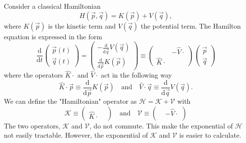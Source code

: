 Consider a classical Hamiltonian
\begin{equation}
H(\vec{p}, \vec{q}) = K(\vec{p}) + V(\vec{q}),
\end{equation}
where $K(\vec{p})$ is the kinetic term and $V(\vec{q})$ the potential term. The Hamilton equation is expressed in the form
\begin{equation}
\frac{\mathrm{d}}{\mathrm{d} t} 
\left( \begin{matrix}
\vec{p}(t) \\
\vec{q}(t)
\end{matrix} \right)
= 
\left( \begin{matrix}
- \frac{\mathrm{d}}{\mathrm{d} \vec{q}} V(\vec{q}) \\
\frac{\mathrm{d}}{\mathrm{d} \vec{p}} K(\vec{p})
\end{matrix} \right)
\equiv
\left( \begin{matrix}
 & - \hat{V} \cdot \\
\hat{K} \cdot &
\end{matrix} \right)
\left( \begin{matrix}
\vec{p} \\
\vec{q}
\end{matrix} \right)
\end{equation}
where the operators $\hat{K} \cdot$ and $\hat{V} \cdot$ act in the following way
\begin{equation}
\hat{K} \cdot \vec{p} \equiv \frac{\mathrm{d}}{\mathrm{d} \vec{p}} K(\vec{p}) \quad \mathrm{and} \quad \hat{V} \cdot \vec{q} \equiv \frac{\mathrm{d}}{\mathrm{d} \vec{q}} V(\vec{q}).
\end{equation}
We can define the "Hamiltonian" operator as $\mathcal{H} = \mathcal{K} + \mathcal{V}$ with
\begin{equation}
\mathcal{K} \equiv \left( \begin{matrix}
 &  \\
\hat{K} \cdot &
\end{matrix} \right)
\quad \mathrm{and} \quad
\mathcal{V} \equiv \left( \begin{matrix}
 &  -\hat{V} \cdot \\
 &
\end{matrix} \right)
\end{equation}
The two operators, $\mathcal{K}$ and $\mathcal{V}$, do not commute. This make the exponential of $\mathcal{H}$ not easily tractable. However, the exponential of  $\mathcal{K}$ and $\mathcal{V}$ is easier to calculate.

